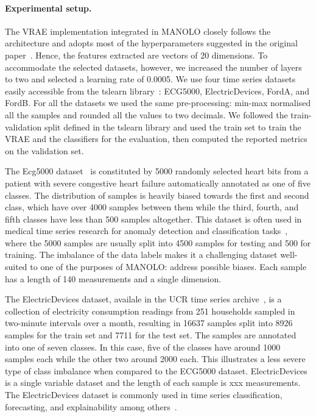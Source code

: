 \paragraph{Experimental setup.} 
The VRAE implementation integrated in MANOLO closely follows the architecture and adopts most of the hyperparameters suggested in the original paper~\cite{2015_ICLRw_VRAE}. Hence, the features extracted are vectors of 20 dimensions. To accommodate the selected datasets, however, we increased the number of layers to two and selected a learning rate of 0.0005. We use four time series datasets easily accessible from the tslearn library~\cite{JMLR:v21:20-091}: ECG5000, ElectricDevices, FordA, and FordB. For all the datasets we used the same pre-processing: min-max normalised all the samples and rounded all the values to two decimals. We followed the train-validation split defined in the tslearn library and used the train set to train the VRAE and the classifiers for the evaluation, then computed the reported metrics on the validation set.

The Ecg5000 dataset~\cite{2000_physiobank_ECG5000} is constituted by 5000 randomly selected heart bits from a patient with severe congestive heart failure automatically annotated as one of five classes. The distribution of samples is heavily biased towards the first and second class, which have over 4000 samples between them while the third, fourth, and fifth classes have less than 500 samples altogether. This dataset is often used in medical time series research for anomaly detection and classification tasks~\cite{2015_ACM_ecg5000InitialPaper, 2022_IEEE_tsmae, 2022_IEEE_lightweight}, where the 5000 samples are usually split into 4500 samples for testing and 500 for training. The imbalance of the data labels makes it a challenging dataset well-suited to one of the purposes of MANOLO: address possible biases. Each sample has a length of 140 measurements and a single dimension. 

The ElectricDevices dataset, availale in the UCR time series archive~\cite{2019_IEEE_ucr}, is a collection of electricity consumption readings from 251 households sampled in two-minute intervals over a month, resulting in 16637 samples split into 8926 samples for the train set and 7711 for the test set. The samples are annotated into one of seven classes. In this case, five of the classes have around 1000 samples each while the other two around 2000 each. This illustrates a less severe type of class imbalance when compared to the ECG5000 dataset. ElectricDevices is a single variable dataset and the length of each sample is xxx measurements. The ElectricDevices dataset is commonly used in time series classification, forecasting, and explainability among others~\cite{2023_Springer_TSandXAI, 2024_IEEE_gmtpm, 2020_IEEE_fastee, 2016_SEKE_time}.

